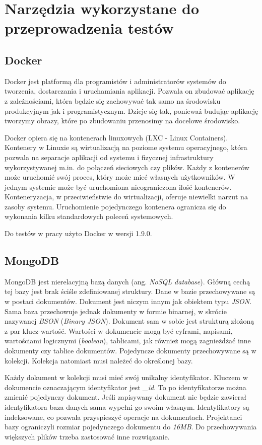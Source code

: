 \chapter{Narzędzia wykorzystane do przeprowadzenia testów}

\section{Docker}
Docker \cite{docker} jest platformą dla programistów i administratorów systemów do tworzenia, dostarczania i uruchamiania aplikacji. Pozwala on zbudować aplikację z zależnościami, która  będzie się zachowywać tak samo na środowisku produkcyjnym jak i programistycznym. Dzieje się tak, ponieważ budując aplikację tworzymy obrazy, które po zbudowaniu przenosimy na docelowe środowisko.

Docker opiera się na kontenerach linuxowych (LXC - Linux Containers). Kontenery w Linuxie są wirtualizacją na poziome systemu operacyjnego, która pozwala na separacje aplikacji od systemu i fizycznej infrastruktury wykorzystywanej m.in. do połączeń sieciowych czy plików. Każdy z kontenerów może uruchomić swój proces, który może mieć własnych użytkowników. W jednym systemie może być uruchomiona nieograniczona ilość kontenerów. Konteneryzacja, w przeciwieństwie do wirtualizacji, oferuje niewielki narzut na zasoby systemu. Uruchomienie pojedynczego kontenera ogranicza się do wykonania kilku standardowych poleceń systemowych. 

Do testów w pracy użyto Docker w wersji 1.9.0.

\section{MongoDB}
MongoDB \cite{mongodb} jest nierelacyjną bazą danych (ang. \textsl{NoSQL database}). Główną cechą tej bazy jest brak ściśle zdefiniowanej struktury. Dane w bazie przechowywane są w postaci dokumentów. Dokument jest niczym innym jak obiektem typu \textsl{JSON}. Sama baza  przechowuje jednak dokumenty w formie binarnej, w skrócie nazywanej \textsl{BSON} (\textsl{Binary JSON}). Dokument sam w sobie jest strukturą złożoną z par klucz-wartość. Wartości w dokumencie mogą być cyframi, napisami, wartościami logicznymi (\textsl{boolean}), tablicami, jak również mogą zagnieżdżać inne dokumenty czy tablice dokumentów. Pojedyncze dokumenty przechowywane są w kolekcji. Kolekcja natomiast musi należeć do określonej bazy.

Każdy dokument w kolekcji musi mieć swój unikalny identyfikator. Kluczem w dokumencie oznaczającym identyfikator jest \textsl{\_id}. To po identyfikatorze można zmienić pojedynczy dokument. Jeśli zapisywany dokument nie będzie zawierał identyfikatora baza danych sama wypełni go swoim własnym. Identyfikatory są indeksowane, co pozwala przyspieszyć operacje na dokumentach. Projektanci bazy ograniczyli rozmiar pojedynczego dokumentu do \textsl{16MB}. Do przechowywania większych plików trzeba zastosować inne rozwiązanie.

